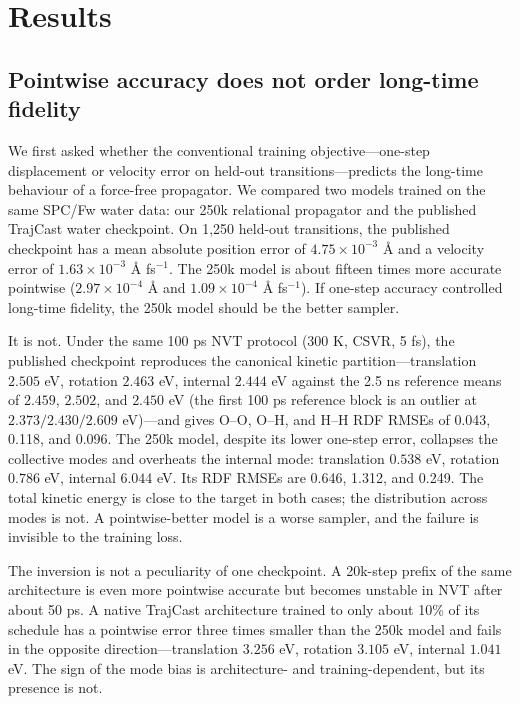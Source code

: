 \section{Results}

\subsection{Pointwise accuracy does not order long-time fidelity}

We first asked whether the conventional training objective---one-step displacement or velocity
error on held-out transitions---predicts the long-time behaviour of a force-free propagator. We
compared two models trained on the same SPC/Fw water data: our 250k relational propagator and the
published TrajCast water checkpoint. On 1,250 held-out transitions, the published checkpoint has a
mean absolute position error of \(4.75\times10^{-3}\) \AA{} and a velocity error of
\(1.63\times10^{-3}\) \AA{} fs\(^{-1}\). The 250k model is about fifteen times more accurate
pointwise (\(2.97\times10^{-4}\) \AA{} and \(1.09\times10^{-4}\) \AA{} fs\(^{-1}\)). If one-step
accuracy controlled long-time fidelity, the 250k model should be the better sampler.

It is not. Under the same 100 ps NVT protocol (300 K, CSVR, 5 fs), the published checkpoint
reproduces the canonical kinetic partition---translation \(2.505\) eV, rotation \(2.463\) eV,
internal \(2.444\) eV against the 2.5 ns reference means of \(2.459\), \(2.502\), and \(2.450\)
eV (the first 100 ps reference block is an outlier at \(2.373/2.430/2.609\) eV)---and gives
O--O, O--H, and H--H RDF RMSEs of 0.043, 0.118, and 0.096. The 250k model, despite its lower
one-step error, collapses the collective modes and overheats the internal mode: translation
\(0.538\) eV, rotation \(0.786\) eV, internal \(6.044\) eV. Its RDF RMSEs are 0.646, 1.312, and
0.249. The total kinetic energy is close to the target in both cases; the distribution across
modes is not. A pointwise-better model is a worse sampler, and the failure is invisible to the
training loss.

The inversion is not a peculiarity of one checkpoint. A 20k-step prefix of the same architecture
is even more pointwise accurate but becomes unstable in NVT after about 50 ps. A native TrajCast
architecture trained to only about 10\% of its schedule has a pointwise error three times smaller
than the 250k model and fails in the opposite direction---translation \(3.256\) eV, rotation
\(3.105\) eV, internal \(1.041\) eV. The sign of the mode bias is architecture- and
training-dependent, but its presence is not.

